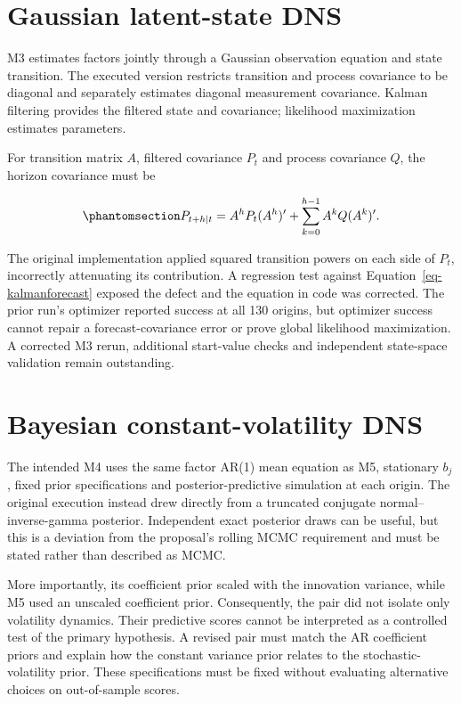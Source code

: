 \documentclass[
  12pt,
  letterpaper,
  DIV=11,
  numbers=noendperiod]{scrreprt}
\begin{document}
\section{Gaussian latent-state DNS}\label{gaussian-latent-state-dns}

M3 estimates factors jointly through a Gaussian observation equation and
state transition. The executed version restricts transition and process
covariance to be diagonal and separately estimates diagonal measurement
covariance. Kalman filtering provides the filtered state and covariance;
likelihood maximization estimates parameters.

For transition matrix \(A\), filtered covariance \(P_t\) and process
covariance \(Q\), the horizon covariance must be

\begin{equation}\protect\phantomsection\label{eq-kalmanforecast}{
P_{t+h|t}=A^hP_t(A^h)'+\sum_{k=0}^{h-1}A^kQ(A^k)'.
}\end{equation}

The original implementation applied squared transition powers on each
side of \(P_t\), incorrectly attenuating its contribution. A regression
test against Equation~\ref{eq-kalmanforecast} exposed the defect and the
equation in code was corrected. The prior run's optimizer reported
success at all 130 origins, but optimizer success cannot repair a
forecast-covariance error or prove global likelihood maximization. A
corrected M3 rerun, additional start-value checks and independent
state-space validation remain outstanding.

\section{Bayesian constant-volatility
DNS}\label{bayesian-constant-volatility-dns}

The intended M4 uses the same factor AR(1) mean equation as M5,
stationary \(b_j\), fixed prior specifications and posterior-predictive
simulation at each origin. The original execution instead drew directly
from a truncated conjugate normal--inverse-gamma posterior. Independent
exact posterior draws can be useful, but this is a deviation from the
proposal's rolling MCMC requirement and must be stated rather than
described as MCMC.

More importantly, its coefficient prior scaled with the innovation
variance, while M5 used an unscaled coefficient prior. Consequently, the
pair did not isolate only volatility dynamics. Their predictive scores
cannot be interpreted as a controlled test of the primary hypothesis. A
revised pair must match the AR coefficient priors and explain how the
constant variance prior relates to the stochastic-volatility prior.
These specifications must be fixed without evaluating alternative
choices on out-of-sample scores.
\end{document}
